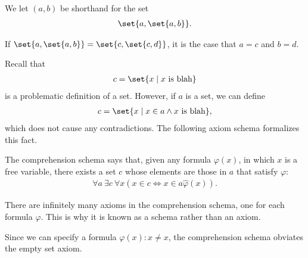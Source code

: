 \documentclass[10pt]{mypackage}
\begin{document}
\begin{definition}
  We let $(a,b)$ be shorthand for the set
  \begin{align*}
    \set{a,\set{a,b}}.
  \end{align*}
\end{definition}
\begin{exercise}
  If $\set{a,\set{a,b}} = \set{c,\set{c,d}}$, it is the case that $a=c$ and $b = d$.
\end{exercise}
Recall that
\begin{align*}
  c = \set{x\mid x\text{ is blah}}
\end{align*}
is a problematic definition of a set. However, if $a$ is a set, we can define
\begin{align*}
  c = \set{x\mid x\in a \wedge x\text{ is blah}},
\end{align*}
which does not cause any contradictions. The following axiom schema formalizes this fact.
\begin{axiom}
  The comprehension schema says that, given any formula $\varphi(x)$, in which $x$ is a free variable, there exists a set $c$ whose elements are those in $a$ that satisfy $\varphi$:
  \begin{align*}
    \forall a\:\exists c\:\forall x\left(x\in c\Leftrightarrow x\in a\hat \varphi(x)\right).
  \end{align*}
\end{axiom}
\begin{remark}
  There are infinitely many axioms in the comprehension schema, one for each formula $\varphi$. This is why it is known as a schema rather than an axiom.
\end{remark}
\begin{remark}
  Since we can specify a formula $\varphi(x): x\neq x$, the comprehension schema obviates the empty set axiom.
\end{remark}
\end{document}
